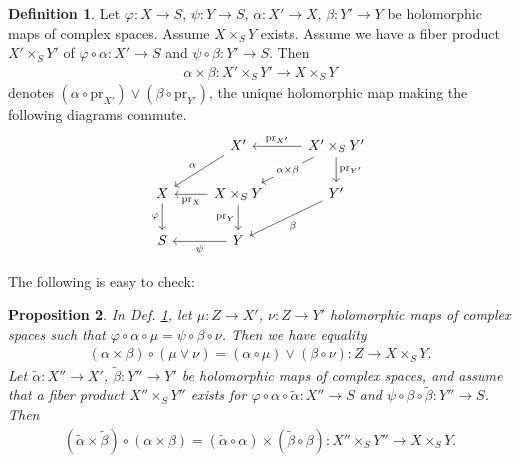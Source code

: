 \documentclass[12pt,b5paper,notitlepage]{report}
\theoremstyle{definition}
\newtheorem{df}{Definition}[section]
\theoremstyle{plain}
\newtheorem{pp}[df]{Proposition}
\newcommand{\wtd}{\widetilde}
\newcommand{\pr}{\mathrm {pr}}
\numberwithin{equation}{section}
\begin{document}
\begin{df}\label{lb28}
Let $\varphi:X\rightarrow S$, $\psi:Y\rightarrow S$, $\alpha:X'\rightarrow X$, $\beta:Y'\rightarrow Y$ be holomorphic maps of complex spaces. Assume $X\times_SY$ exists. Assume we have a fiber product $X'\times_SY'$ of $\varphi\circ\alpha:X'\rightarrow S$ and $\psi\circ\beta:Y'\rightarrow S$. Then 
\begin{align}
\alpha\times\beta:X'\times_S Y'\rightarrow X\times_SY
\end{align}
denotes $(\alpha\circ\pr_{X'})\vee(\beta\circ\pr_{Y'})$, the unique holomorphic map making the following diagrams commute.
\begin{equation}
\begin{tikzcd}
                  &           X'     \arrow[ld,"\alpha"']                    & X'\times_SY' \arrow[ld, "\alpha\times\beta" description] \arrow[l, "\pr_{X'}"'] \arrow[d, "\pr_{Y'}"] \\
X \arrow[d, "\varphi"'] & X\times_SY \arrow[l, "\pr_X"] \arrow[d, "\pr_Y"'] &              Y' \arrow[ld,"\beta"]                                                 \\
S                 & Y \arrow[l, "\psi"]                  &                                                              
\end{tikzcd}
\end{equation}
\end{df}

The following is easy to check:
\begin{pp}\label{lb30}
In Def. \ref{lb28}, let $\mu:Z\rightarrow X'$, $\nu:Z\rightarrow Y'$ holomorphic maps of complex spaces such that $\varphi\circ\alpha\circ\mu=\psi\circ\beta\circ\nu$. Then we have equality
\begin{align}
(\alpha\times\beta)\circ (\mu\vee\nu)=(\alpha\circ\mu)\vee(\beta\circ\nu):Z\rightarrow X\times_SY.
\end{align}
Let $\wtd\alpha:X''\rightarrow X'$, $\wtd\beta:Y''\rightarrow Y'$ be holomorphic maps of complex spaces, and assume that a fiber product $X''\times_SY''$ exists for $\varphi\circ\alpha\circ\wtd\alpha:X''\rightarrow S$ and $\psi\circ\beta\circ\wtd\beta:Y''\rightarrow S$. Then
\begin{align}
(\wtd\alpha\times\wtd\beta)\circ(\alpha\times\beta)=(\wtd\alpha\circ\alpha)\times(\wtd\beta\circ\beta):X''\times_SY''\rightarrow X\times_SY.
\end{align}
\end{pp}
\end{document}
